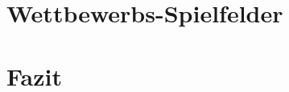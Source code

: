 \documentclass[12pt,a4paper]{article}
\begin{document}
\section{Wettbewerbs-Spielfelder}

\newpage
\section{Fazit}
\end{document}
